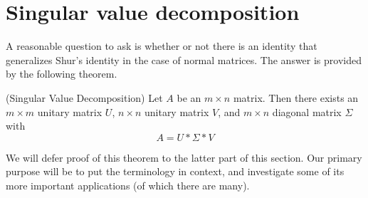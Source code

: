 \section{Singular value decomposition} A reasonable question to ask is whether or not there is an identity that generalizes Shur's identity in the case of normal matrices. The answer is provided by the following theorem.

\begin{thm} (Singular Value Decomposition) Let $A$ be an $m\times n$ matrix. Then there exists an $m\times m$ unitary matrix $U$, $n\times n$ unitary matrix $V$, and $m\times n$ diagonal matrix $\Sigma$ with
\[
A = U*\Sigma*V
\]
\end{thm}

We will defer proof of this theorem to the latter part of this section. Our primary purpose will be to put the terminology in context, and investigate some of its more important applications (of which there are many).

